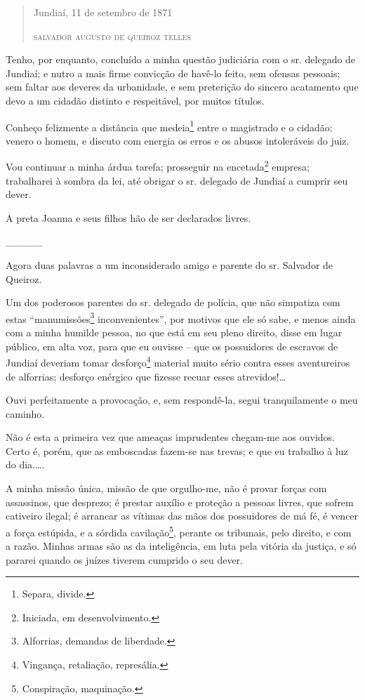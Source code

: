{\begin{quote}
\begin{flushright}
Jundiaí, 11 de setembro de 1871

\textsc{salvador augusto de queiroz telles}
\end{flushright}
\end{quote}


\asterisc{}

Tenho, por enquanto, concluído a minha questão judiciária com o sr.
delegado de Jundiaí; e nutro a mais firme convicção de havê-lo feito,
sem ofensas pessoais; sem faltar aos deveres da urbanidade, e sem
preterição do sincero acatamento que devo a um cidadão distinto e
respeitável, por muitos títulos.

Conheço felizmente a distância que medeia\footnote{ Separa, divide.}
entre o magistrado e o cidadão: venero o homem, e discuto com energia os
erros e os abusos intoleráveis do juiz.

Vou continuar a minha árdua tarefa; prosseguir na encetada\footnote{
  Iniciada, em desenvolvimento.} empresa; trabalharei à sombra da lei,
até obrigar o sr. delegado de Jundiaí a cumprir seu dever.

A preta Joanna e seus filhos hão de ser declarados livres.

\_\_\_\_\_

Agora duas palavras a um inconsiderado amigo e parente do sr. Salvador
de Queiroz.

Um dos poderosos parentes do sr. delegado de polícia, que não simpatiza
com estas ``manumissões\footnote{ Alforrias, demandas de liberdade.}
inconvenientes'', por motivos que ele só sabe, e menos ainda com a minha
humilde pessoa, no que está em seu pleno direito, disse em lugar
público, em alta voz, para que eu ouvisse -- que os possuidores de
escravos de Jundiaí deveriam tomar desforço\footnote{ Vingança,
  retaliação, represália.} material muito sério contra esses
aventureiros de alforrias; desforço enérgico que fizesse recuar esses
atrevidos!\ldots{}

Ouvi perfeitamente a provocação, e, sem respondê-la, segui
tranquilamente o meu caminho.

Não é esta a primeira vez que ameaças imprudentes chegam-me aos
ouvidos.\\
Certo é, porém, que as emboscadas fazem-se nas trevas; e que eu trabalho
à luz do dia.\ldots.

A minha missão única, missão de que orgulho-me, não é provar forças com
assassinos, que desprezo; é prestar auxílio e proteção a pessoas livres,
que sofrem cativeiro ilegal; é arrancar as vítimas das mãos dos
possuidores de má fé, é vencer a força estúpida, e a sórdida
cavilação\footnote{ Conspiração, maquinação.}, perante os tribunais,
pelo direito, e com a razão. Minhas armas são as da inteligência, em
luta pela vitória da justiça, e só pararei quando os juízes tiverem
cumprido o seu dever.

}
